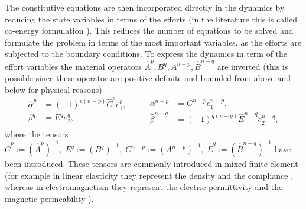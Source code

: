 \documentclass{elsarticle}
\newcommand{\revTwo}[1]{{\color{black}#1}}
\newcommand*{\dual}[1]{\ensuremath{\widehat{#1}}}
\begin{document}
The constitutive equations are then incorporated directly in the dynamics by reducing the state variables in terms of the efforts \revTwo{(in the literature this is called co-energy formulation \cite{brugnoli2020})}. This reduces the number of equations to be solved and formulate the problem in terms of the most important variables, as the efforts are subjected to the boundary conditions. \revTwo{To express the dynamics in term of the effort variables the material operators $\dual{A}^p, B^q, A^{n-p}, \dual{B}^{n-q}$ are inverted (this is possible since these operator are positive definite and bounded from above and below for physical reasons)
\begin{equation}\label{eq:effort_CE}
     \begin{aligned}
     \dual{\alpha}^p &= (-1)^{p(n-p)}\dual{C}^p \dual{e}^p_1, \\
      \beta^{q} &= E^q {e}^q_2, \\
     \end{aligned} \qquad 
     \begin{aligned}
      \alpha^{n-p} &= {C}^{n-p} e_1^{n-p}, \\
      \dual{\beta}^{n-q} &= (-1)^{q(n-q)}  \dual{E}^{n-q} \dual{e}^{n-q}_2, 
     \end{aligned}
\end{equation}
where the tensors $\dual{C}^p:= (\dual{A}^p)^{-1}, \; E^q := (B^q)^{-1}, \; {C}^{n-p}:=({A}^{n-p})^{-1} , \; \dual{E}^q := (\dual{B}^{n-q})^{-1}$ have been introduced. These tensors are commonly introduced in mixed finite element (for example in linear elasticity they represent the density and the compliance \cite{arnold2014weak}, whereas in electromagnetism they represent the electric permittivity and the magnetic permeability \cite{asad2019maxwell}). 
}
\end{document}
